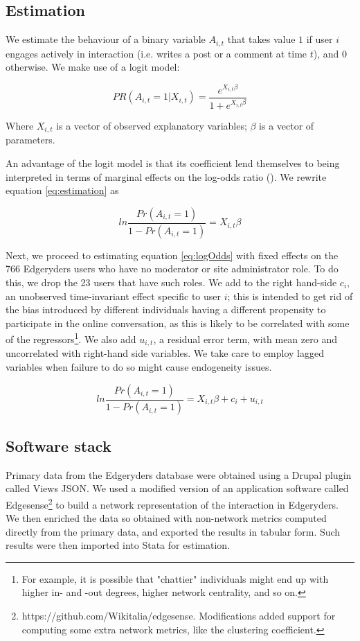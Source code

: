 \subsection{Estimation}

We estimate the behaviour of a binary variable $A_{i,t}$ that takes value $1$ if user $i$ engages actively in interaction (i.e. writes a post or a comment at time $t$), and $0$ otherwise. We make use of a logit model:

\begin{equation}
	PR(A_{i,t}= 1|X_{i,t}) = \frac{e^{X_{i,t}\beta}}{1 + e^{X_{i,t}\beta}}
	\label{eq:estimation}
\end{equation}

Where $X_{i,t}$ is a vector of observed explanatory variables; $\beta$ is a vector of parameters.

An advantage of the logit model is that its coefficient lend themselves to being interpreted in terms of marginal effects on the log-odds ratio (\cite{cameron2005microeconometrics}). We rewrite equation \ref{eq:estimation} as

\begin{equation}
	ln \frac{Pr(A_{i,t} = 1)}{1 - Pr(A_{i,t}=1)} = X_{i,t} \beta 
	\label{eq:logOdds}
\end{equation}

Next, we proceed to estimating equation \ref{eq:logOdds} with fixed effects on the 766 Edgeryders users who have no moderator or site administrator role. To do this, we drop the 23 users that have such roles. We add to the right hand-side
$c_i$, an unobserved time-invariant effect specific to user $i$; this is intended to get rid of the bias introduced by different individuals having a different propensity to participate in the online conversation, as this is likely to be correlated with some of the regressors\footnote{For example, it is possible that "chattier" individuals might end up with higher in- and -out degrees, higher network centrality, and so on. }. We also add $u_{i,t}$, a residual error term, with mean zero and uncorrelated with right-hand side variables. We take care to employ lagged variables when failure to do so might cause endogeneity issues. 

\begin{equation}
	ln \frac{Pr(A_{i,t} = 1)}{1 - Pr(A_{i,t}=1)} = X_{i,t} \beta + c_i + u_{i,t}
	\label{eq:logOddsErrors}
\end{equation}

\subsection{Software stack}
Primary data from the Edgeryders database were obtained using a Drupal plugin called Views JSON. We used a modified version of an application software called Edgesense\footnote{https://github.com/Wikitalia/edgesense. Modifications added support for computing some extra network metrics, like the clustering coefficient.} to build a network representation of the interaction in Edgeryders. We then enriched the data so obtained with non-network metrics computed directly from the primary data, and exported the results in tabular form. Such results were then imported into Stata for estimation. 

